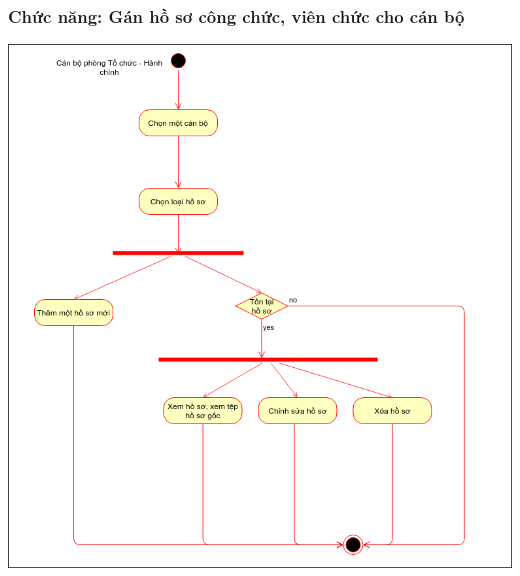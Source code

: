 \subsubsection{Chức năng: Gán hồ sơ công chức, viên chức cho cán bộ}
\begin{center}
  \captionsetup{type=figure}
  \includegraphics[width=15cm]{img/UML/TchcStaff/activityQuanLyHoSo.png}
\end{center}

